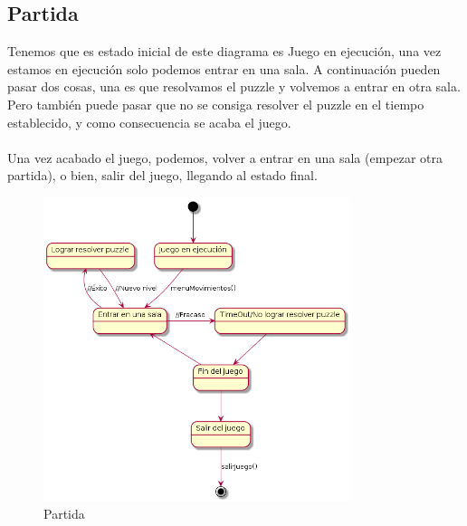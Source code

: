 \subsection{Partida}\label{sec:uc0}
  Tenemos que es estado inicial de este diagrama es Juego en ejecución, una vez estamos en ejecución solo podemos entrar en una sala. A continuación pueden pasar dos cosas, una es que resolvamos el puzzle y volvemos a entrar en otra sala. Pero también puede pasar que no se consiga resolver el puzzle en el tiempo establecido, y como consecuencia se acaba el juego.
  \\
  \\Una vez acabado el juego, podemos, volver a entrar en una sala (empezar otra partida), o bien, salir del juego, llegando al estado final.
  \\
\begin{figure}[ht]
	\centering
	\includegraphics[width=0.8\textwidth]{./imatges/Partida.png}
	\caption{Partida}
\end{figure}
  
